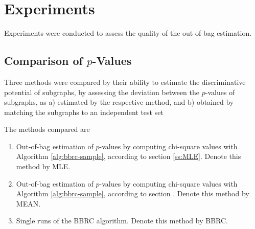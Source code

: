 \documentclass{article}
\begin{document}

\section{Experiments}
\label{s:Experiments}
Experiments were conducted to assess the quality of the out-of-bag estimation.

\subsection{Comparison of $p$-Values} Three methods were compared by their
ability to estimate the discriminative potential of subgraphs, by assessing the
deviation between the $p$-values of subgraphs, as a) estimated by the
respective method, and b) obtained by matching the subgraphs to an independent
test set

The methods compared are

\begin{enumerate} 
  \item{Out-of-bag estimation of $p$-values by computing
    chi-square values with Algorithm \ref{alg:bbrc-sample}, according to
    section \ref{ss:MLE}. Denote this method by MLE.} 
  \item{Out-of-bag
    estimation of $p$-values by computing chi-square values with Algorithm
    \ref{alg:bbrc-sample}, according to section . Denote
    this method by MEAN.} 
  \item{Single runs of the BBRC algorithm. Denote this
    method by BBRC.} 
\end{enumerate}
\end{document}

